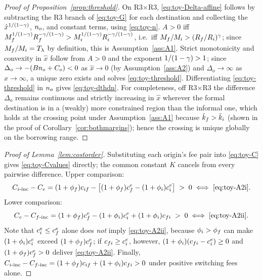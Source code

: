 \documentclass[12pt]{article}
\begin{document}
\begin{proof}[Proof of Proposition~\ref{prop:threshold}]
On R3$\times$R3, \eqref{eq:toy-Delta-affine} follows by subtracting the
R3 branch of \eqref{eq:toy-G} for each destination and collecting the
$\hat x^{1/(1-\gamma)}$, $n_{o}$, and constant terms, using
\eqref{eq:toy-n}. $A>0$ iff
$M_{f}^{1/(1-\gamma)}R_{f}^{-\gamma/(1-\gamma)}
>M_{i}^{1/(1-\gamma)}R_{i}^{-\gamma/(1-\gamma)}$, i.e.\ iff
$M_{f}/M_{i}>(R_{f}/R_{i})^{\gamma}$; since
$M_{f}/M_{i}=T_{\lambda}$ by definition, this is
Assumption~\ref{ass:A1}. Strict monotonicity and convexity in
$\hat x$ follow from $A>0$ and the exponent $1/(1-\gamma)>1$; since
$\Delta_{o}\to -(Bn_{o}+C_{o})<0$ as $\hat x\to0$ (by
Assumption~\ref{ass:A2}) and $\Delta_{o}\to\infty$ as $\hat x\to\infty$, a unique zero
exists and solves \eqref{eq:toy-threshold}. Differentiating
\eqref{eq:toy-threshold} in $n_{o}$ gives \eqref{eq:toy-dthdn}.
For completeness, off R3$\times$R3 the difference
$\Delta_{o}$ remains continuous and strictly increasing in $\hat x$
wherever the formal destination is in a (weakly) more constrained
region than the informal one, which holds at the crossing point under
Assumption~\ref{ass:A1} because $\tilde k_{f}>\tilde k_{i}$
(shown in the proof of Corollary~\ref{cor:bothmargins}); hence the
crossing is unique globally on the borrowing range.
\end{proof}
\begin{proof}[Proof of Lemma~\ref{lem:costorder}]
Substituting each origin's fee pair into
\eqref{eq:toy-C} gives \eqref{eq:toy-Cvalues} directly; the common
constant $K$ cancels from every pairwise difference. Upper comparison:
\begin{equation*}
  C_{i\text{-inc}}-C_{e}
  =(1+\phi_{f})c_{if}
   -\big[(1+\phi_{f})c^{e}_{f}-(1+\phi_{i})c^{e}_{i}\big]
  \;>\;0
  \iff \text{\eqref{eq:toy-A2i}} .
\end{equation*}
Lower comparison:
\begin{equation*}
  C_{e}-C_{f\text{-inc}}
  =(1+\phi_{f})c^{e}_{f}-(1+\phi_{i})c^{e}_{i}
   +(1+\phi_{i})c_{fi}
  \;>\;0
  \iff \text{\eqref{eq:toy-A2ii}} .
\end{equation*}
Note that $c^{e}_{i}\leq c^{e}_{f}$ alone does \emph{not} imply
\eqref{eq:toy-A2ii}, because $\phi_{i}>\phi_{f}$ can make
$(1+\phi_{i})c^{e}_{i}$ exceed
$(1+\phi_{f})c^{e}_{f}$; if
$c_{fi}\geq c^{e}_{i}$, however,
$(1+\phi_{i})(c_{fi}-c^{e}_{i})\geq0$ and
$(1+\phi_{f})c^{e}_{f}>0$ deliver \eqref{eq:toy-A2ii}. Finally,
$C_{i\text{-inc}}-C_{f\text{-inc}}
=(1+\phi_{f})c_{if}
+(1+\phi_{i})c_{fi}>0$ under positive switching fees
alone.
\end{proof}
 
\end{document}
